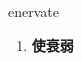 
\begin{frame}
{\huge enervate}
\begin{center}
\begin{enumerate}\Large
  \item \textbf{使衰弱}
\end{enumerate}
\end{center}
\end{frame}
